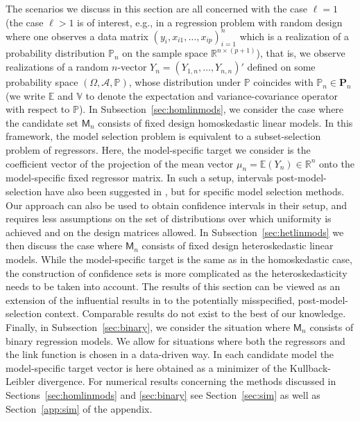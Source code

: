\documentclass[preprint]{imsart}
\newcommand{\R}{{\mathbb R}}
\newcommand{\E}{{\mathbb E}}
\newcommand{\V}{{\mathbb V}}
\renewcommand{\P}{{\mathbb P}}
\numberwithin{equation}{section}
\begin{document}
The scenarios we discuss in this section are all concerned with the case $\ell=1$ (the case $\ell>1$ is of interest, e.g., in a regression problem with random design where one observes a data matrix $(y_i, x_{i1}, \dots, x_{ip})_{i=1}^n$ which is a realization of a probability distribution $\P_n$ on the sample space $\R^{n\times (p+1)}$), that is, we observe realizations of a random $n$-vector $Y_n=(Y_{1,n}, \dots, Y_{n,n})'$ defined on some probability space $(\Omega, \mathcal A, \P)$, whose distribution under $\P$ coincides with $\P_n\in\mathbf{P}_n$ (we write $\E$ and $\V$ to denote the expectation and variance-covariance operator with respect to $\P$). In Subsection~\ref{sec:homlinmods}, we consider the case where the candidate set $\mathsf{M}_n$ consists of fixed design homoskedastic linear models. In this framework, the model selection problem is equivalent to a subset-selection problem of regressors. Here, the model-specific target we consider is the coefficient vector of the projection of the mean vector $\mu_n = \E(Y_n)\in\R^n$ onto the model-specific fixed regressor matrix. In such a setup, intervals post-model-selection have also been suggested in \cite{Tib15a}, but for specific model selection methods. Our approach can also be used to obtain confidence intervals in their setup, and requires less assumptions on the set of distributions over which uniformity is achieved and on the design matrices allowed. In Subsection~\ref{sec:hetlinmods} we then discuss the case where $\mathsf{M}_n$ consists of fixed design heteroskedastic linear models. While the model-specific target is the same as in the homoskedastic case, the construction of confidence sets is more complicated as the heteroskedasticity needs to be taken into account. The results of this section can be viewed as an extension of the influential results in \cite{eicker67} to the potentially misspecified, post-model-selection context. Comparable results do not exist to the best of our knowledge. Finally, in Subsection~\ref{sec:binary}, we consider the situation where $\mathsf{M}_n$ consists of binary regression models. We allow for situations where both the regressors and the link function is chosen in a data-driven way. In each candidate model the model-specific target vector is here obtained as a minimizer of the Kullback-Leibler divergence. For numerical results concerning the methods discussed in Sections~\ref{sec:homlinmods} and \ref{sec:binary} see Section~\ref{sec:sim} as well as Section~\ref{app:sim} of the appendix.
%
\end{document}
